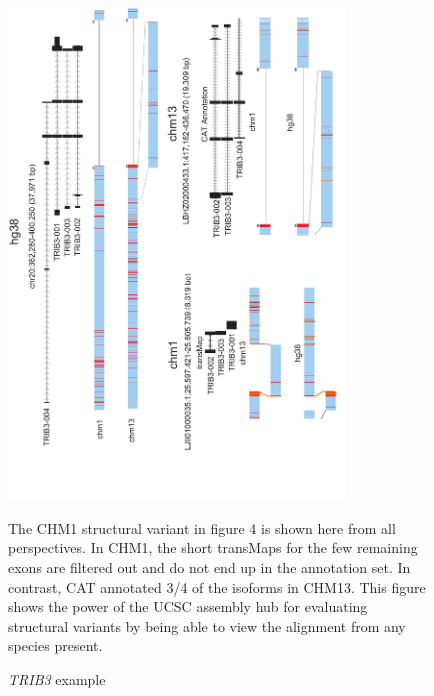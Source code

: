 \begin{figure}
\centering
\includegraphics[width=0.8\textwidth,height=0.7\textheight,keepaspectratio]{Supplemental_Figure_S7.pdf}
\caption{\textit{TRIB3} example}
The CHM1 structural variant in figure 4 is shown here from all perspectives. In CHM1, the short transMaps for the few remaining exons are filtered out and do not end up in the annotation set. In contrast, CAT annotated 3/4 of the isoforms in CHM13. This figure shows the power of the UCSC assembly hub for evaluating structural variants by being able to view the alignment from any species present.
\label{supp_fig:trib3}
\end{figure}

